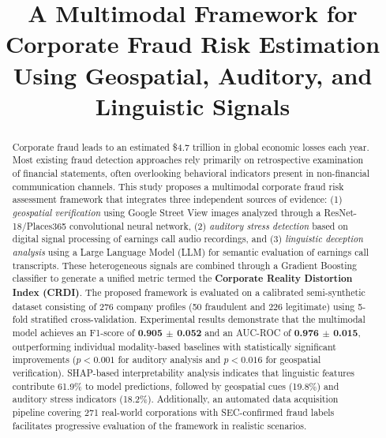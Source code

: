 \documentclass[conference]{IEEEtran}
\begin{document}
\title{A Multimodal Framework for Corporate Fraud Risk Estimation\\
Using Geospatial, Auditory, and Linguistic Signals}

\author{
\and
{}
\and
{}
}

\maketitle

\begin{abstract}
Corporate fraud leads to an estimated \$4.7 trillion in global economic losses each year. Most existing fraud detection approaches rely primarily on retrospective examination of financial statements, often overlooking behavioral indicators present in non-financial communication channels. This study proposes a multimodal corporate fraud risk assessment framework that integrates three independent sources of evidence: (1) \emph{geospatial verification} using Google Street View images analyzed through a ResNet-18/Places365 convolutional neural network, (2) \emph{auditory stress detection} based on digital signal processing of earnings call audio recordings, and (3) \emph{linguistic deception analysis} using a Large Language Model (LLM) for semantic evaluation of earnings call transcripts. These heterogeneous signals are combined through a Gradient Boosting classifier to generate a unified metric termed the \textbf{Corporate Reality Distortion Index (CRDI)}. The proposed framework is evaluated on a calibrated semi-synthetic dataset consisting of 276 company profiles (50 fraudulent and 226 legitimate) using 5-fold stratified cross-validation. Experimental results demonstrate that the multimodal model achieves an F1-score of \textbf{0.905 $\pm$ 0.052} and an AUC-ROC of \textbf{0.976 $\pm$ 0.015}, outperforming individual modality-based baselines with statistically significant improvements ($p < 0.001$ for auditory analysis and $p < 0.016$ for geospatial verification). SHAP-based interpretability analysis indicates that linguistic features contribute 61.9\% to model predictions, followed by geospatial cues (19.8\%) and auditory stress indicators (18.2\%). Additionally, an automated data acquisition pipeline covering 271 real-world corporations with SEC-confirmed fraud labels facilitates progressive evaluation of the framework in realistic scenarios.
\end{abstract}
\end{document}
